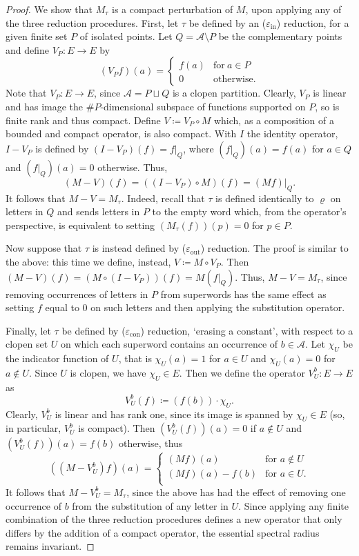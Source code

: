 \documentclass[10pt,a4paper]{amsart}
\newcommand{\A}{\mc A}
\newcommand{\mc}{\mathcal}
\newcommand{\sub}{\varrho}
\begin{document}
\begin{proof}
We show that \(M_\tau\) is a compact perturbation of \(M\), upon applying any of the three reduction procedures. First, let \(\tau\) be defined by an (\(\varepsilon_\mathrm{in}\)) reduction, for a given finite set \(P\) of isolated points. Let \(Q = \A \setminus P\) be the complementary points and define \(V_P \colon E \to E\) by 
\[
(V_P f)(a) =
\begin{cases}
f(a) & \text{for} \ a \in P \\
0    & \text{otherwise.}
\end{cases}
\]
Note that \(V_P \colon E \to E\), since \(\A = P \sqcup Q\) is a clopen partition. Clearly, \(V_P\) is linear and has image the \(\#P\)-dimensional subspace of functions supported on \(P\), so is finite rank and thus compact. Define \(V \coloneqq V_P \circ M\) which, as a composition of a bounded and compact operator, is also compact. With \(I\) the identity operator, \(I - V_P\) is defined by \((I - V_P)(f) = f |_Q\), where \((f |_Q)(a) = f(a)\) for \(a \in Q\) and \((f |_Q)(a) = 0\) otherwise. Thus,
\[
(M-V)(f) = ((I-V_P) \circ M)(f) = (Mf) |_Q .
\]
It follows that \(M - V = M_\tau\). Indeed, recall that \(\tau\) is defined identically to \(\sub\) on letters in \(Q\) and sends letters in \(P\) to the empty word which, from the operator's perspective, is equivalent to setting \((M_\tau(f))(p) = 0\) for \(p \in P\).

Now suppose that \(\tau\) is instead defined by (\(\varepsilon_\mathrm{out}\)) reduction. The proof is similar to the above: this time we define, instead, \(V \coloneqq M \circ V_P\). Then \((M-V)(f) = (M \circ (I-V_P))(f) = M (f|_Q)\). Thus, \(M-V = M_\tau\), since removing occurrences of letters in \(P\) from superwords has the same effect as setting \(f\) equal to \(0\) on such letters and then applying the substitution operator.

Finally, let \(\tau\) be defined by (\(\varepsilon_\mathrm{con}\)) reduction, `erasing a constant', with respect to a clopen set \(U\) on which each superword contains an occurrence of \(b \in \A\). Let \(\chi_U\) be the indicator function of \(U\), that is \(\chi_U(a) = 1\) for \(a \in U\) and \(\chi_U(a) = 0\) for \(a \notin U\). Since \(U\) is clopen, we have \(\chi_U \in E\). Then we define the operator \(V_U^b \colon E \to E\) as
\[
V_U^b(f) \coloneqq (f(b)) \cdot \chi_U .
\]
Clearly, \(V_U^b\) is linear and has rank one, since its image is spanned by \(\chi_U \in E\) (so, in particular, \(V_U^b\) is compact). Then \((V_U^b(f))(a) = 0\) if \(a \notin U\) and \((V_U^b(f))(a) = f(b)\) otherwise, thus
\[
((M - V_U^b)f)(a) =
\begin{cases}
(Mf)(a)        & \text{for } a \notin U \\
(Mf)(a) - f(b) & \text{for } a \in U . \\
\end{cases}
\]
It follows that \(M-V_U^b = M_\tau\), since the above has had the effect of removing one occurrence of \(b\) from the substitution of any letter in \(U\). Since applying any finite combination of the three reduction procedures defines a new operator that only differs by the addition of a compact operator, the essential spectral radius remains invariant.
\end{proof}
\end{document}
